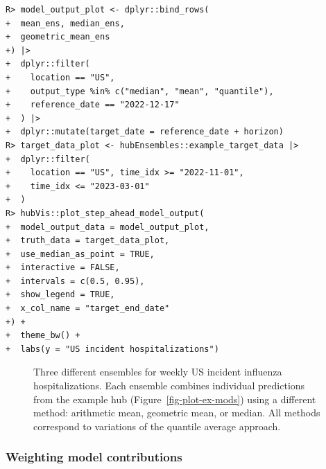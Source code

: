 \documentclass[
  article,
  shortnames,
  notitle]{jss}
\begin{document}
\begin{verbatim}
R> model_output_plot <- dplyr::bind_rows(
+  mean_ens, median_ens,
+  geometric_mean_ens
+) |>
+  dplyr::filter(
+    location == "US",
+    output_type %in% c("median", "mean", "quantile"),
+    reference_date == "2022-12-17"
+  ) |>
+  dplyr::mutate(target_date = reference_date + horizon)
R> target_data_plot <- hubEnsembles::example_target_data |>
+  dplyr::filter(
+    location == "US", time_idx >= "2022-11-01",
+    time_idx <= "2023-03-01"
+  )
R> hubVis::plot_step_ahead_model_output(
+  model_output_data = model_output_plot,
+  truth_data = target_data_plot,
+  use_median_as_point = TRUE,
+  interactive = FALSE,
+  intervals = c(0.5, 0.95),
+  show_legend = TRUE,
+  x_col_name = "target_end_date"
+) +
+  theme_bw() +
+  labs(y = "US incident hospitalizations")
\end{verbatim}

\begin{figure}[H]


\caption{\label{fig-plot-ensembles}Three different ensembles for weekly
US incident influenza hospitalizations. Each ensemble combines
individual predictions from the example hub
(Figure~\ref{fig-plot-ex-mods}) using a different method: arithmetic
mean, geometric mean, or median. All methods correspond to variations of
the quantile average approach.}

\end{figure}%

\subsubsection{Weighting model
contributions}\label{weighting-model-contributions}
\end{document}
